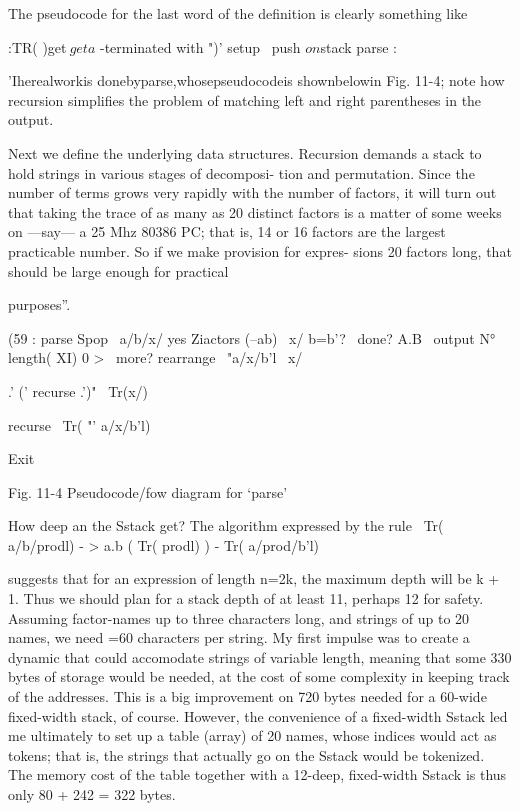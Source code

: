 The pseudocode for the last word of the deﬁnition is clearly
something like

:TR( )get$ \ get a $ -terminated with ")'
setup \ push $ on $stack
parse :

'Iherealworkis donebyparse,whosepseudocodeis shownbelowin
Fig. 11-4; note how recursion simpliﬁes the problem of matching left
and right parentheses in the output.

Next we define the underlying data structures. Recursion
demands a stack to hold strings in various stages of decomposi-
tion and permutation. Since the number of terms grows very
rapidly with the number of factors, it will turn out that taking the
trace of as many as 20 distinct factors is a matter of some weeks
on —say— a 25 Mhz 80386 PC; that is, 14 or 16 factors are the
largest practicable number. So if we make provision for expres-
sions 20 factors long, that should be large enough for practical

purposes”.


(59 : parse Spop \ a/b/x/
yes Ziactors (--ab) \ x/
b=b'? \ done?
A.B \ output
N° length( XI) 0 > \ more?
rearrange \ "a/x/b'l
\ x/

 

.' (' recurse .')" \ Tr(x/)

 

recurse \ Tr( "' a/x/b'l)

 

Exit

 

 

Fig. 11-4 Pseudocode/fow diagram for ‘parse'

How deep an the Sstack get? The algorithm expressed by the rule
\ Tr( a/b/prodl) - > a.b ( Tr( prodl) ) - Tr( a/prod/b'l)

suggests that for an expression of length n=2k, the maximum
depth will be k + 1. Thus we should plan for a stack depth of at
least 11, perhaps 12 for safety. Assuming factor-names up to three
characters long, and strings of up to 20 names, we need =60
characters per string. My first impulse was to create a dynamic
 that could accomodate strings of variable length, meaning
that some 330 bytes of storage would be needed, at the cost of
some complexity in keeping track of the addresses. This is a big
improvement on 720 bytes needed for a 60-wide fixed-width
stack, of course. However, the convenience of a fixed-width
Sstack led me ultimately to set up a table (array) of 20 names,
whose indices would act as tokens; that is, the strings that actually
go on the Sstack would be tokenized. The memory cost of the
table together with a 12-deep, fixed-width Sstack is thus only
80 + 242 = 322 bytes.

